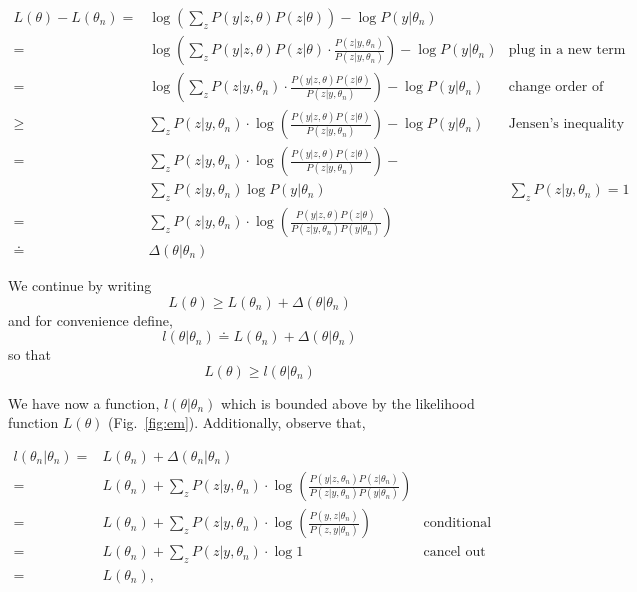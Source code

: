 \documentclass{article}  %
\begin{document}
\begin{align*}
L(\theta) - L(\theta_n) = &\log \left(\sum_z P(y|z,\theta)P(z|\theta)\right) - \log P(y|\theta_n) \\
  = &\log  \left(\sum_z P(y|z,\theta)P(z|\theta)\cdot
  \frac{P(z|y,\theta_n)}{P(z|y,\theta_n)}\right) - \log P(y|\theta_n) & \text{plug in a new term}\\
  = & \log  \left(\sum_z P(z|y,\theta_n)\cdot \frac{P(y|z,\theta)P(z|\theta)}{P(z|y,\theta_n)}\right) - \log P(y|\theta_n)  & \text{change order of enumerators} \\
  \geq& \sum_z P(z|y,\theta_n)\cdot \log \left(\frac{P(y|z,\theta)P(z|\theta)}{P(z|y,\theta_n)} \right)- \log P(y|\theta_n)  & \text{Jensen's inequality} \\
  = &\sum_z P(z|y,\theta_n)\cdot \log \left(\frac{P(y|z,\theta)P(z|\theta)}{P(z|y,\theta_n)} \right)- \\
 &  \sum_z P(z|y,\theta_n) \log P(y|\theta_n)   & \text{$\sum_z P(z|y, \theta_n) = 1$} \\
 = & \sum_z P(z|y,\theta_n)\cdot \log \left(\frac{P(y|z,\theta)P(z|\theta)}{P(z|y,\theta_n)P(y|\theta_n)} \right)\\
 \doteq  &\Delta (\theta|\theta_n)
\end{align*}

We continue by writing 
\[
L(\theta) \geq L(\theta_n) + \Delta(\theta|\theta_n)
\]
and for convenience define,
\[
l(\theta|\theta_n) \doteq L(\theta_n) + \Delta(\theta|\theta_n)
\]
so that 
\[
L(\theta) \geq l(\theta|\theta_n)
\]

We have now a function, $l(\theta|\theta_n)$ which is bounded above by the likelihood function $L(\theta)$ (Fig.~\ref{fig:em}). Additionally, observe that,

\begin{align*}
l(\theta_n|\theta_n) = & L(\theta_n) + \Delta(\theta_n|\theta_n)\\
 = & L(\theta_n) +  \sum_z P(z|y,\theta_n)\cdot \log \left(\frac{P(y|z,\theta_n)P(z|\theta_n)}{P(z|y,\theta_n)P(y|\theta_n)} \right)\\
 = & L(\theta_n) +  \sum_z P(z|y,\theta_n)\cdot \log \left(\frac{P(y,z|\theta_n)}{P(z,y|\theta_n)} \right) & \text{conditional prob}\\
 = & L(\theta_n) +  \sum_z P(z|y,\theta_n)\cdot \log 1 & \text{cancel out} \\
 = & L(\theta_n),
\end{align*}
\end{document}
